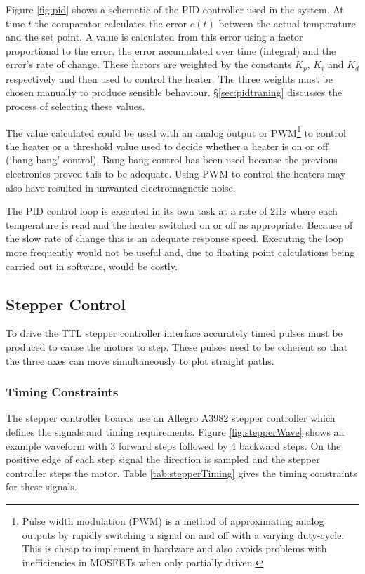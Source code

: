 				Figure \ref{fig:pid} shows a schematic of the PID controller used in the
				system. At time $t$ the comparator calculates the error $e(t)$ between
				the actual temperature and the set point. A value is calculated from
				this error using a factor proportional to the error, the error
				accumulated over time (integral) and the error's rate of change. These
				factors are weighted by the constants $K_p$, $K_i$ and $K_d$
				respectively and then used to control the heater. The three weights must
				be chosen manually to produce sensible behaviour.
				\S\ref{sec:pidtraning} discusses the process of selecting these values.
				
				The value calculated could be used with an analog output or
				PWM\footnote{Pulse width modulation (PWM) is a method of approximating
				analog outputs by rapidly switching a signal on and off with a varying
				duty-cycle. This is cheap to implement in hardware and also avoids
				problems with inefficiencies in MOSFETs when only partially driven.} to
				control the heater or a threshold value used to decide whether a heater
				is on or off (`bang-bang' control). Bang-bang control has been used
				because the previous electronics proved this to be adequate. Using PWM
				to control the heaters may also have resulted in unwanted
				electromagnetic noise.
				
				The PID control loop is executed in its own task at a rate of 2Hz where
				each temperature is read and the heater switched on or off as
				appropriate. Because of the slow rate of change this is an adequate
				response speed. Executing the loop more frequently would not be useful
				and, due to floating point calculations being carried out in software,
				would be costly.
		
		\subsection{Stepper Control}
			
			To drive the TTL stepper controller interface accurately timed pulses must
			be produced to cause the motors to step. These pulses need to be coherent
			so that the three axes can move simultaneously to plot straight paths.
			
			\subsubsection{Timing Constraints}
				
				The stepper controller boards use an Allegro A3982 stepper controller
				which defines the signals and timing requirements. Figure
				\ref{fig:stepperWave} shows an example waveform with 3 forward steps
				followed by 4 backward steps. On the positive edge of each step signal
				the direction is sampled and the stepper controller steps the motor.
				Table \ref{tab:stepperTiming} gives the timing constraints for these
				signals.
				
